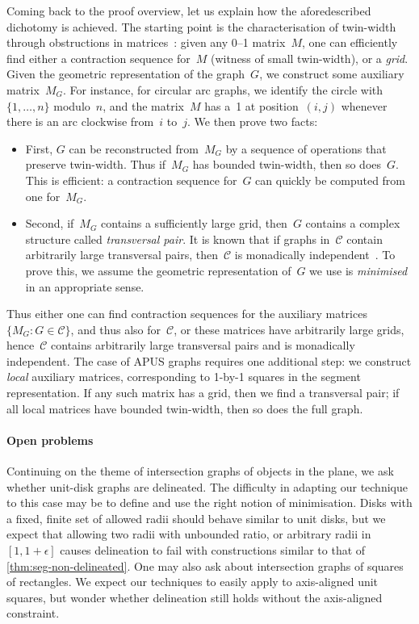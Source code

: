 \documentclass[a4paper,UKenglish,cleveref,thm-restate]{lipics-v2021}
\theoremstyle{remark}
\newcommand{\Cc}{\mathcal{C}}
\begin{document}
Coming back to the proof overview, let us explain how the aforedescribed dichotomy is achieved.
The starting point is the characterisation of twin-width through obstructions in matrices~\cite{Bonnet2022twinwidth1}:
given any 0--1 matrix~$M$, one can efficiently find either a contraction sequence for~$M$ (witness of small twin-width), or a \emph{grid}.
Given the geometric representation of the graph~$G$, we construct some auxiliary matrix~$M_G$.
For instance, for circular arc graphs, we identify the circle with $\{1,\dots,n\}$ modulo~$n$, and the matrix~$M$ has a~1 at position~$(i,j)$ whenever there is an arc clockwise from~$i$ to~$j$.
We then prove two facts:
\begin{itemize}
    \item First, $G$ can be reconstructed from~$M_G$ by a sequence of operations that preserve twin-width.
    Thus if~$M_G$ has bounded twin-width, then so does~$G$. This is efficient: a contraction sequence for~$G$ can quickly be computed from one for~$M_G$.
    \item Second, if~$M_G$ contains a sufficiently large grid, then~$G$ contains a complex structure called \emph{transversal pair}.
    It is known that if graphs in~$\Cc$ contain arbitrarily large transversal pairs, then~$\Cc$ is monadically independent~\cite{bonnet2022delineation}.
    To prove this, we assume the geometric representation of~$G$ we use is \emph{minimised} in an appropriate sense.
\end{itemize}
Thus either one can find contraction sequences for the auxiliary matrices $\{M_G : G \in \Cc\}$, and thus also for~$\Cc$,
or these matrices have arbitrarily large grids, hence~$\Cc$ contains arbitrarily large transversal pairs and is monadically independent.
The case of APUS graphs requires one additional step: we construct \emph{local} auxiliary matrices, corresponding to 1-by-1 squares in the segment representation.
If any such matrix has a grid, then we find a transversal pair; if all local matrices have bounded twin-width, then so does the full graph.


\paragraph*{Open problems}
Continuing on the theme of intersection graphs of objects in the plane, we ask whether unit-disk graphs are delineated.
The difficulty in adapting our technique to this case may be to define and use the right notion of minimisation.
Disks with a fixed, finite set of allowed radii should behave similar to unit disks,
but we expect that allowing two radii with unbounded ratio, or arbitrary radii in $[1,1+\epsilon]$ causes delineation to fail with constructions similar to that of \cref{thm:seg-non-delineated}.
One may also ask about intersection graphs of squares of rectangles.
We expect our techniques to easily apply to axis-aligned unit squares, but wonder whether delineation still holds without the axis-aligned constraint.
\end{document}
